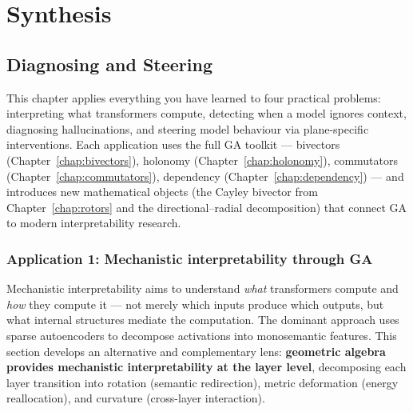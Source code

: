 \documentclass[11pt, twoside, openright]{memoir}
\numberwithin{equation}{chapter}
\begin{document}
\part{Synthesis}
\label{part:synthesis}


\chapter{Diagnosing and Steering}
\label{chap:applications}

\begin{whycare}
This chapter applies everything you have learned to four practical
problems: interpreting what transformers compute, detecting when a model
ignores context, diagnosing hallucinations, and steering model behaviour
via plane-specific interventions.  Each application uses the full GA
toolkit --- bivectors (Chapter~\ref{chap:bivectors}), holonomy
(Chapter~\ref{chap:holonomy}), commutators
(Chapter~\ref{chap:commutators}), dependency
(Chapter~\ref{chap:dependency}) --- and introduces new mathematical
objects (the Cayley bivector from Chapter~\ref{chap:rotors} and the
directional--radial decomposition) that connect GA to modern
interpretability research.
\end{whycare}

\section{Application 1: Mechanistic interpretability through GA}
\label{sec:mech-interp}

Mechanistic interpretability aims to understand \emph{what}
transformers compute and \emph{how} they compute it --- not merely
which inputs produce which outputs, but what internal structures
mediate the computation.  The dominant approach uses sparse
autoencoders to decompose activations into monosemantic features.
This section develops an alternative and complementary lens:
\textbf{geometric algebra provides mechanistic interpretability at the
layer level}, decomposing each layer transition into rotation
(semantic redirection), metric deformation (energy reallocation),
and curvature (cross-layer interaction).
\end{document}

